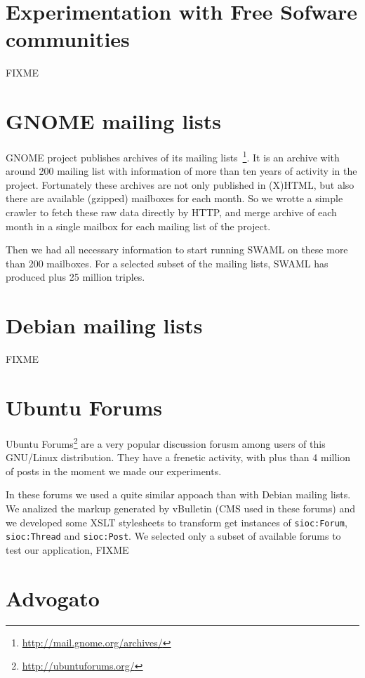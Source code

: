 \documentclass{../templates/www2008-submission}
\begin{document}
\section{Experimentation with Free Sofware communities}

FIXME

\section{\label{sec:gnome}GNOME mailing lists}

GNOME project publishes archives of its mailing lists~\footnote{\url{http://mail.gnome.org/archives/}}.
It is an archive with around 200 mailing list with information of 
more than ten years of activity in the project. Fortunately these
archives are not only published in (X)HTML, but also there are 
available (gzipped) mailboxes for each month. So we wrotte a simple
crawler to fetch these raw data directly by HTTP, and merge archive
of each month in a single mailbox for each mailing list of the project.

Then we had all necessary information to start running SWAML on these 
more than 200 mailboxes. For a selected subset of the mailing lists, 
SWAML has produced plus 25 million triples.

\section{Debian mailing lists}

FIXME

\section{Ubuntu Forums}

Ubuntu Forums\footnote{\url{http://ubuntuforums.org/}} are a very popular 
discussion forusm among users of this GNU/Linux distribution. They have a 
frenetic activity, with plus than 4 million of posts in the moment we made
our experiments.

In these forums we used a quite similar appoach than with Debian mailing
lists. We analized the markup generated by vBulletin (CMS used in these forums)
and we developed some XSLT stylesheets to transform get instances of
\texttt{sioc:Forum}, \texttt{sioc:Thread} and \texttt{sioc:Post}. We 
selected only a subset of available forums to test our application, FIXME

\section{Advogato}
\end{document}

